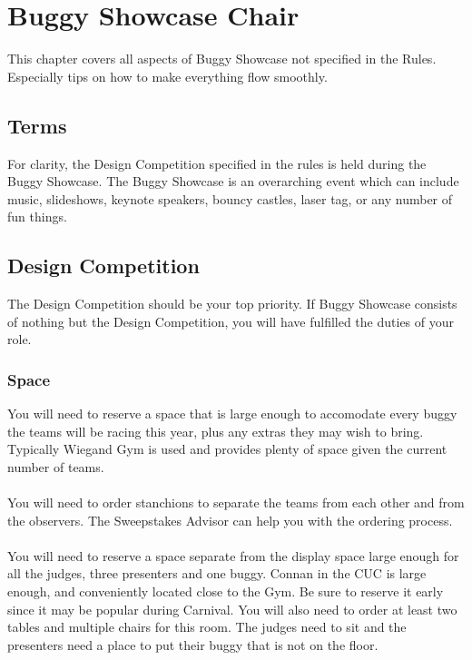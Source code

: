 \chapter{Buggy Showcase Chair}
\label{ch:Showcase Chair}
This chapter covers all aspects of Buggy Showcase not specified in the Rules.
Especially tips on how to make everything flow smoothly.

\section{Terms}
For clarity, the Design Competition specified in the rules is held during the
Buggy Showcase. The Buggy Showcase is an overarching event which can include
music, slideshows, keynote speakers, bouncy castles, laser tag, or any number
of fun things.

\section{Design Competition}
\label{sec:Design Comp}
The Design Competition should be your top priority. If Buggy Showcase consists
of nothing but the Design Competition, you will have fulfilled the duties of
your role.

\subsection{Space}
You will need to reserve a space that is large enough to accomodate every buggy
the teams will be racing this year, plus any extras they may wish to bring.
Typically Wiegand Gym is used and provides plenty of space given the current
number of teams.
\\\\
You will need to order stanchions to separate the teams from each other
and from the observers. The Sweepstakes Advisor can help you with the ordering
process.
\\\\
You will need to reserve a space separate from the display space large enough
for all the judges, three presenters and one buggy. Connan in the CUC is
large enough, and conveniently located close to the Gym. Be sure to reserve
it early since it may be popular during Carnival. You will also need to order
at least two tables and multiple chairs for this room. The judges need to sit
and the presenters need a place to put their buggy that is not on the floor.

